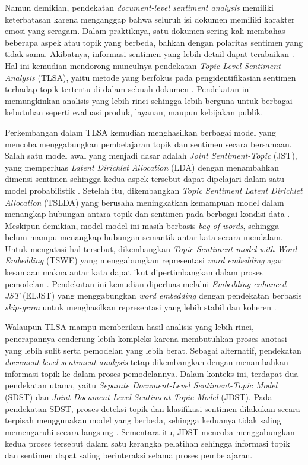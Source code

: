 \bigskip

Namun demikian, pendekatan \textit{document-level sentiment analysis} memiliki
keterbatasan karena menganggap bahwa seluruh isi dokumen memiliki karakter
emosi yang seragam. Dalam praktiknya, satu dokumen sering kali membahas
beberapa aspek atau topik yang berbeda, bahkan dengan polaritas sentimen yang
tidak sama. Akibatnya, informasi sentimen yang lebih detail dapat terabaikan
\parencite{pang2008opinion}. Hal ini kemudian mendorong munculnya pendekatan
\textit{Topic-Level Sentiment Analysis} (TLSA), yaitu metode yang berfokus
pada pengidentifikasian sentimen terhadap topik tertentu di dalam sebuah
dokumen \parencite{titov2008}. Pendekatan ini memungkinkan analisis yang lebih
rinci sehingga lebih berguna untuk berbagai kebutuhan seperti evaluasi produk,
layanan, maupun kebijakan publik.

\bigskip

Perkembangan dalam TLSA kemudian menghasilkan berbagai model yang mencoba
menggabungkan pembelajaran topik dan sentimen secara bersamaan. Salah satu
model awal yang menjadi dasar adalah \textit{Joint Sentiment-Topic} (JST),
yang memperluas \textit{Latent Dirichlet Allocation} (LDA) dengan menambahkan
dimensi sentimen sehingga kedua aspek tersebut dapat dipelajari dalam satu
model probabilistik \parencite{lin2009joint, blei2012probabilistic}. Setelah
itu, dikembangkan \textit{Topic Sentiment Latent Dirichlet Allocation} (TSLDA)
yang berusaha meningkatkan kemampuan model dalam menangkap hubungan antara
topik dan sentimen pada berbagai kondisi data \parencite{nguyen2015tslda}.
Meskipun demikian, model-model ini masih berbasis \textit{bag-of-words},
sehingga belum mampu menangkap hubungan semantik antar kata secara mendalam.
Untuk mengatasi hal tersebut, dikembangkan \textit{Topic Sentiment model with
Word Embedding} (TSWE) yang menggabungkan representasi \textit{word embedding}
agar kesamaan makna antar kata dapat ikut dipertimbangkan dalam proses
pemodelan \parencite{fu2016tswe}. Pendekatan ini kemudian diperluas melalui
\textit{Embedding-enhanced JST} (ELJST) yang menggabungkan
\textit{word embedding} dengan pendekatan berbasis \textit{skip-gram} untuk
menghasilkan representasi yang lebih stabil dan koheren
\parencite{sengupta2021eljst}.

\bigskip

Walaupun TLSA mampu memberikan hasil analisis yang lebih rinci, penerapannya
cenderung lebih kompleks karena membutuhkan proses anotasi yang lebih sulit
serta pemodelan yang lebih berat. Sebagai alternatif, pendekatan
\textit{document-level sentiment analysis} tetap dikembangkan dengan
menambahkan informasi topik ke dalam proses pemodelannya. Dalam konteks ini,
terdapat dua pendekatan utama, yaitu \textit{Separate Document-Level
Sentiment-Topic Model} (SDST) dan \textit{Joint Document-Level Sentiment-Topic
Model} (JDST). Pada pendekatan SDST, proses deteksi topik dan klasifikasi
sentimen dilakukan secara terpisah menggunakan model yang berbeda, sehingga
keduanya tidak saling memengaruhi secara langsung \parencite{sengupta2021eljst}.
Sementara itu, JDST mencoba menggabungkan kedua proses tersebut dalam satu
kerangka pelatihan sehingga informasi topik dan sentimen dapat saling
berinteraksi selama proses pembelajaran.

